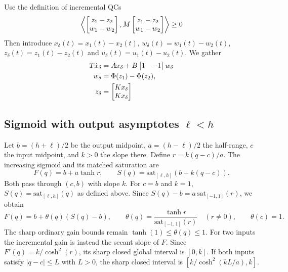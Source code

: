 \documentclass[10pt,a4paper]{article}
\theoremstyle{definition}
\theoremstyle{remark}
\begin{document}
Use the definition of incremental QCs
\begin{equation}
    \left\langle \begin{bmatrix}z_1-z_2\\ w_1-w_2\end{bmatrix}, M\begin{bmatrix}z_1-{z}_2\\w_1-{w}_2\end{bmatrix} \right\rangle\geq 0
\end{equation}
Then introduce $x_{\delta}(t) = x_1(t) - {x}_2(t)$, ${w}_{\delta}(t) = w_1(t) - {w}_2(t)$, $z_\delta(t) = z_1(t) - {z}_2(t)$ and ${u}_{\delta}(t) = u_1(t)-{u}_2(t)$.
We gather
\begin{align}\label{eqn:lfrsatsys}
    T\dot{x}_\delta &= Ax_\delta + B\begin{bmatrix}1&-1\end{bmatrix}{w}_\delta\\
    {w}_{\delta} &= \Phi(z_1)-\Phi(z_2),\\
    {z}_\delta &=\begin{bmatrix}Kx_\delta\\Kx_\delta\end{bmatrix}
\end{align}
\subsection{Sigmoid with output asymptotes \(\ell<h\)}
Let \(b=(h+\ell)/2\) be the output midpoint, \(a=(h-\ell)/2\) the
half-range, \(c\) the input midpoint, and \(k>0\) the slope there.
Define \(r=k(q-c)/a\). The increasing sigmoid and its matched saturation are
\[
 F(q)=b+a\tanh r,\qquad S(q)=\mathrm{sat}_{[\ell,h]}(b+k(q-c)).
\]
Both pass through \((c,b)\) with slope \(k\). For \(c=b\) and \(k=1\),
\(S(q)=\mathrm{sat}_{[\ell,h]}(q)\) as defined above.
Since \(S(q)-b=a\,\mathrm{sat}_{[-1,1]}(r)\), we obtain
\[
 F(q)=b+\theta(q)(S(q)-b),\qquad
 \theta(q)=\frac{\tanh r}{\mathrm{sat}_{[-1,1]}(r)}
 \quad(r\ne0),\qquad \theta(c)=1 .
\]
The sharp ordinary gain bounds remain \(\tanh(1)\le\theta(q)\le1\).
For two inputs the incremental gain is instead the secant slope of \(F\).
Since \(F'(q)=k/\cosh^2(r)\), its sharp closed global interval is
\([0,k]\). If both inputs satisfy \(|q-c|\le L\) with \(L>0\), the
sharp closed interval is \([k/\cosh^2(kL/a),k]\).


\end{document}
